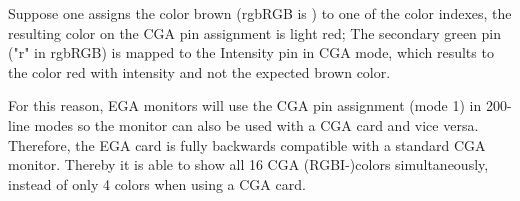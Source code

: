 \documentclass[book.tex]{subfiles}
\begin{document}
\par
Suppose one assigns the color brown (rgbRGB is ) to one of the color indexes, the resulting color on the CGA pin assignment is light red; The secondary green pin ("r" in rgbRGB) is mapped to the Intensity pin in CGA mode, which results to the color red with intensity and not the expected brown color. \\

\par
For this reason, EGA monitors will use the CGA pin assignment (mode 1) in 200-line modes so the monitor can also be used with a CGA card and vice versa. Therefore, the EGA card is fully backwards compatible with a standard CGA monitor. Thereby it is able to show all 16 CGA (RGBI-)colors simultaneously, instead of only 4 colors when using a CGA card.  \\
\end{document}
